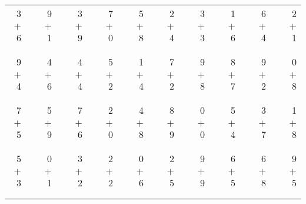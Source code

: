 \documentclass[12pt, letterpaper]{article}
\begin{document}
\begin{tabular}{rrrrrrrrrrrrrrrrrrr}
3 & & 9 & & 3 & & 7 & & 5 & & 2 & & 3 & & 1 & & 6 & & 2\\
$+$ 6 & & $+$ 1 & & $+$ 9 & & $+$ 0 & & $+$ 8 & & $+$ 4 & & $+$ 3 & & $+$ 6 & & $+$ 4 & & $+$ 1\\
\cline{1-1} \cline{3-3} \cline{5-5} \cline{7-7} \cline{9-9} \cline{11-11} \cline{13-13} \cline{15-15} \cline{17-17} \cline{19-19} \\ \\
9 & & 4 & & 4 & & 5 & & 1 & & 7 & & 9 & & 8 & & 9 & & 0\\
$+$ 4 & & $+$ 6 & & $+$ 4 & & $+$ 2 & & $+$ 4 & & $+$ 2 & & $+$ 8 & & $+$ 7 & & $+$ 2 & & $+$ 8\\
\cline{1-1} \cline{3-3} \cline{5-5} \cline{7-7} \cline{9-9} \cline{11-11} \cline{13-13} \cline{15-15} \cline{17-17} \cline{19-19} \\ \\
7 & & 5 & & 7 & & 2 & & 4 & & 8 & & 0 & & 5 & & 3 & & 1\\
$+$ 5 & & $+$ 9 & & $+$ 6 & & $+$ 0 & & $+$ 8 & & $+$ 9 & & $+$ 0 & & $+$ 4 & & $+$ 7 & & $+$ 8\\
\cline{1-1} \cline{3-3} \cline{5-5} \cline{7-7} \cline{9-9} \cline{11-11} \cline{13-13} \cline{15-15} \cline{17-17} \cline{19-19} \\ \\
5 & & 0 & & 3 & & 2 & & 0 & & 2 & & 9 & & 6 & & 6 & & 9\\
$+$ 3 & & $+$ 1 & & $+$ 2 & & $+$ 2 & & $+$ 6 & & $+$ 5 & & $+$ 9 & & $+$ 5 & & $+$ 8 & & $+$ 5\\
\cline{1-1} \cline{3-3} \cline{5-5} \cline{7-7} \cline{9-9} \cline{11-11} \cline{13-13} \cline{15-15} \cline{17-17} \cline{19-19} \\ \\
\end{tabular}
\newpage
\end{document}
